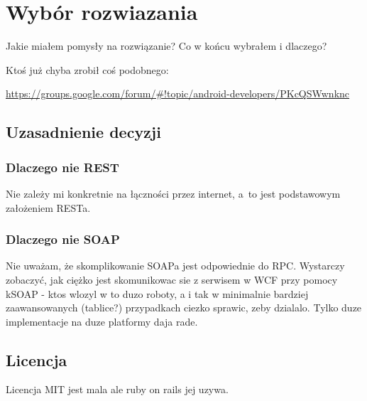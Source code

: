 \section{Wybór rozwiazania}
Jakie miałem pomysły na rozwiązanie? Co w końcu wybrałem i dlaczego?

Ktoś już chyba zrobił coś podobnego:

\url{https://groups.google.com/forum/#!topic/android-developers/PKcQSWwnknc}

\subsection{Uzasadnienie decyzji}
\subsubsection{Dlaczego nie REST}
Nie zależy mi konkretnie na łączności przez internet, a~to jest podstawowym założeniem RESTa.

\subsubsection{Dlaczego nie SOAP}
Nie uważam, że skomplikowanie SOAPa jest odpowiednie do RPC. Wystarczy zobaczyć, jak ciężko jest skomunikowac sie z serwisem w WCF przy pomocy kSOAP - ktos wlozyl w to duzo roboty, a i tak w minimalnie bardziej zaawansowanych (tablice?) przypadkach ciezko sprawic, zeby dzialalo. Tylko duze implementacje na duze platformy daja rade.

\subsection{Licencja}
Licencja MIT jest mala ale ruby on rails jej uzywa.

%
%
%
%

